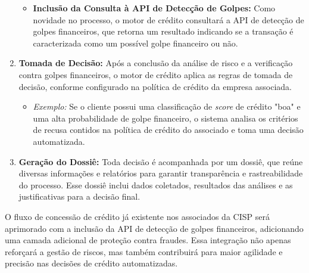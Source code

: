 \documentclass[12pt,a4paper]{article}
\begin{document}
\begin{enumerate}
\begin{itemize}
        \item \textbf{Inclusão da Consulta à API de Detecção de Golpes:} 
        Como novidade no processo, o motor de crédito consultará a API de detecção de golpes financeiros, que retorna um resultado indicando se a transação é caracterizada como um possível golpe financeiro ou não.
    \end{itemize}

    \item \textbf{Tomada de Decisão:} 
    Após a conclusão da análise de risco e a verificação contra golpes financeiros, o motor de crédito aplica as regras de tomada de decisão, conforme configurado na política de crédito da empresa associada.
    \begin{itemize}
        \item \textit{Exemplo:} Se o cliente possui uma classificação de \textit{score} de crédito "boa" e uma alta probabilidade de golpe financeiro, o sistema analisa os critérios de recusa contidos na política de crédito do associado e toma uma decisão automatizada.
    \end{itemize}

    \item \textbf{Geração do Dossiê:} 
    Toda decisão é acompanhada por um dossiê, que reúne diversas informações e relatórios para garantir transparência e rastreabilidade do processo. Esse dossiê inclui dados coletados, resultados das análises e as justificativas para a decisão final.
\end{enumerate}

O fluxo de concessão de crédito já existente nos associados da CISP será aprimorado com a inclusão da API de detecção de golpes financeiros, adicionando uma camada adicional de proteção contra fraudes. Essa integração não apenas reforçará a gestão de riscos, mas também contribuirá para maior agilidade e precisão nas decisões de crédito automatizadas.

\newpage

\end{document}
